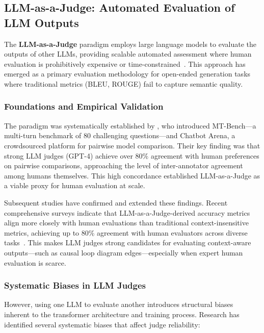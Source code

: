 
\subsection{LLM-as-a-Judge: Automated Evaluation of LLM Outputs}
\label{sec:lit_llm_as_judge}

The \textbf{LLM-as-a-Judge} paradigm employs large language models to evaluate the outputs of other LLMs, providing scalable automated assessment where human evaluation is prohibitively expensive or time-constrained~\citep{zheng2024judging}. This approach has emerged as a primary evaluation methodology for open-ended generation tasks where traditional metrics (BLEU, ROUGE) fail to capture semantic quality.

\subsubsection{Foundations and Empirical Validation}

The paradigm was systematically established by \citet{zheng2024judging}, who introduced MT-Bench---a multi-turn benchmark of 80 challenging questions---and Chatbot Arena, a crowdsourced platform for pairwise model comparison. Their key finding was that strong LLM judges (GPT-4) achieve over 80\% agreement with human preferences on pairwise comparisons, approaching the level of inter-annotator agreement among humans themselves. This high concordance established LLM-as-a-Judge as a viable proxy for human evaluation at scale.

Subsequent studies have confirmed and extended these findings. Recent comprehensive surveys indicate that LLM-as-a-Judge-derived accuracy metrics align more closely with human evaluations than traditional context-insensitive metrics, achieving up to 80\% agreement with human evaluators across diverse tasks~\citep{li2024llmsjudges}. This makes LLM judges strong candidates for evaluating context-aware outputs---such as causal loop diagram edges---especially when expert human evaluation is scarce.

\subsubsection{Systematic Biases in LLM Judges}

However, using one LLM to evaluate another introduces structural biases inherent to the transformer architecture and training process. Research has identified several systematic biases that affect judge reliability:

